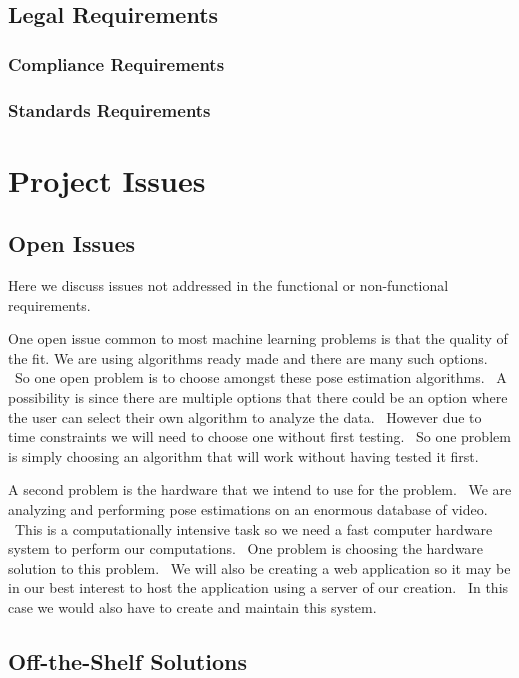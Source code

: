 \documentclass{scrreprt}
\begin{document}
\section{Legal Requirements}

\subsection{Compliance Requirements}

\subsection{Standards Requirements}

\chapter{Project Issues}

\section{Open Issues}

{Here we discuss issues not addressed in the functional or
non-functional requirements.}

{One open issue common to most machine learning problems is that the
quality of the fit. We are using algorithms ready made and there are
many such options. ~So one open problem is to choose amongst these pose
estimation algorithms. ~A possibility is since there are multiple
options that there could be an option where the user can select their
own algorithm to analyze the data. ~However due to time constraints we
will need to choose one without first testing. ~So one problem is simply
choosing an algorithm that will work without having tested it first.}

{A second problem is the hardware that we intend to use for the problem.
~We are analyzing and performing pose estimations on an enormous
database of video. ~This is a computationally intensive task so we need
a fast computer hardware system to perform our computations. ~One
problem is choosing the hardware solution to this problem. ~We will also
be creating a web application so it may be in our best interest to host
the application using a server of our creation. ~In this case we would
also have to create and maintain this system.}

\section{Off-the-Shelf Solutions}
\end{document}
